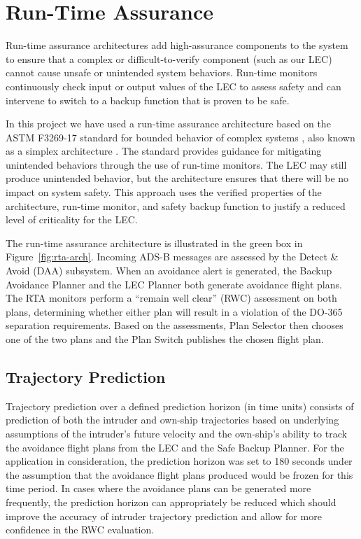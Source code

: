 \section{Run-Time Assurance}
\label{sec:rta}

Run-time assurance architectures add high-assurance components
to the system to ensure that a complex or difficult-to-verify component (such as our LEC) cannot cause
unsafe or unintended system behaviors. Run-time monitors
continuously check input or output values of the LEC to assess safety and can intervene to
switch to a backup function that is proven to be safe. 

In this project we have used a
run-time assurance architecture based on the ASTM F3269-17
standard for bounded behavior of complex systems \cite{F3269-17}, also
known as a simplex architecture \cite{simplex}. The standard provides
guidance for mitigating unintended behaviors through the
use of run-time monitors. The LEC may still produce unintended
behavior, but the architecture ensures that there will
be no impact on system safety. This approach  uses
the verified properties of the architecture, run-time monitor,
and safety backup function to justify a reduced level of
criticality for the LEC.

The run-time assurance architecture is illustrated in the green box in Figure~\ref{fig:rta-arch}.  Incoming ADS-B messages are assessed by the Detect \& Avoid (DAA) subsystem.  When an avoidance alert is generated, the Backup Avoidance Planner and the LEC Planner both generate avoidance flight plans.  The RTA monitors perform a ``remain well clear'' (RWC) assessment on both plans, determining whether either plan will result in a violation of the DO-365 separation requirements.  Based on the assessments, Plan Selector then chooses one of the two plans and the Plan Switch publishes the chosen flight plan.

\subsection{Trajectory Prediction} 
Trajectory prediction over a defined prediction horizon (in time units) consists of prediction of both the intruder and own-ship trajectories based on underlying assumptions of the intruder's future velocity and the own-ship's ability to track the avoidance flight plans from the LEC and the Safe Backup Planner. For the application in consideration, the prediction horizon was set to 180 seconds under the assumption that the avoidance flight plans produced would be frozen for this time period. In cases where the avoidance plans can be generated more frequently, the prediction horizon can appropriately be reduced which should improve the accuracy of intruder trajectory prediction and allow for more confidence in the RWC evaluation.

